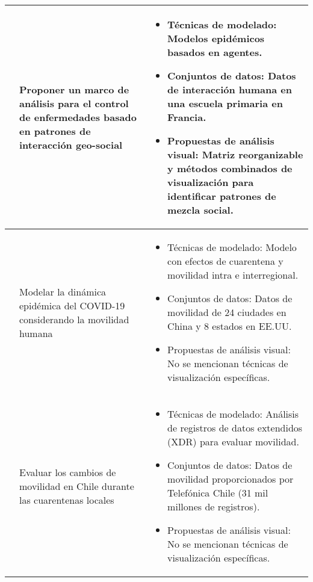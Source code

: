\documentclass[sigconf]{acmart}
\begin{document}
\begin{table*}[h]
{\begin{tabular}{|p{1cm}|p{4cm}|p{11cm}|}
\cite{luo2016geo} & Proponer un marco de análisis para el control de enfermedades basado en patrones de interacción geo-social &
\begin{minipage}[t]{11cm}
  \begin{itemize}
    \item Técnicas de modelado: Modelos epidémicos basados en agentes.
    \item Conjuntos de datos: Datos de interacción humana en una escuela primaria en Francia.
    \item Propuestas de análisis visual: Matriz reorganizable y métodos combinados de visualización para identificar patrones de mezcla social.
  \end{itemize}
\end{minipage} \\ \hline

\cite{du2021dynamics} & Modelar la dinámica epidémica del COVID-19 considerando la movilidad humana &
\begin{minipage}[t]{11cm}
  \begin{itemize}
    \item Técnicas de modelado: Modelo con efectos de cuarentena y movilidad intra e interregional.
    \item Conjuntos de datos: Datos de movilidad de 24 ciudades en China y 8 estados en EE.UU.
    \item Propuestas de análisis visual: No se mencionan técnicas de visualización específicas.
  \end{itemize}
\end{minipage} \\ \hline

\cite{pappalardo2023dataset} & Evaluar los cambios de movilidad en Chile durante las cuarentenas locales &
\begin{minipage}[t]{11cm}
  \begin{itemize}
    \item Técnicas de modelado: Análisis de registros de datos extendidos (XDR) para evaluar movilidad.
    \item Conjuntos de datos: Datos de movilidad proporcionados por Telefónica Chile (31 mil millones de registros).
    \item Propuestas de análisis visual: No se mencionan técnicas de visualización específicas.
  \end{itemize}
\end{minipage} \\ \hline


\end{tabular}}
\end{table*}
\end{document}
